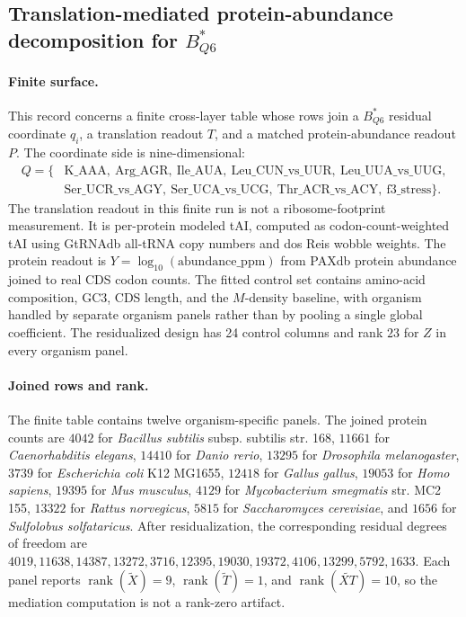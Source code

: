 \subsection{Translation-mediated protein-abundance decomposition for $B^*_{Q6}$}\label{sec:biorality-q6-translation-mediated-protein-abundance}

\paragraph{Finite surface.}
This record concerns a finite cross-layer table whose rows join a $B^*_{Q6}$ residual coordinate $q_i$, a translation readout $T$, and a matched protein-abundance readout $P$.  The coordinate side is nine-dimensional:
$$
\begin{aligned}
Q = \{&\mathrm{K\_AAA},\ \mathrm{Arg\_AGR},\ \mathrm{Ile\_AUA},\ \mathrm{Leu\_CUN\_vs\_UUR},\ \mathrm{Leu\_UUA\_vs\_UUG},\\
&\mathrm{Ser\_UCR\_vs\_AGY},\ \mathrm{Ser\_UCA\_vs\_UCG},\ \mathrm{Thr\_ACR\_vs\_ACY},\ \mathrm{f3\_stress}\}.
\end{aligned}
$$
The translation readout in this finite run is not a ribosome-footprint measurement.  It is per-protein modeled tAI, computed as codon-count-weighted tAI using GtRNAdb all-tRNA copy numbers and dos Reis wobble weights.  The protein readout is $Y=\log_{10}(\mathrm{abundance\_ppm})$ from PAXdb protein abundance joined to real CDS codon counts.  The fitted control set contains amino-acid composition, GC3, CDS length, and the $M$-density baseline, with organism handled by separate organism panels rather than by pooling a single global coefficient.  The residualized design has 24 control columns and rank $23$ for $Z$ in every organism panel.

\paragraph{Joined rows and rank.}
The finite table contains twelve organism-specific panels.  The joined protein counts are $4042$ for \emph{Bacillus subtilis} subsp. subtilis str. 168, $11661$ for \emph{Caenorhabditis elegans}, $14410$ for \emph{Danio rerio}, $13295$ for \emph{Drosophila melanogaster}, $3739$ for \emph{Escherichia coli} K12 MG1655, $12418$ for \emph{Gallus gallus}, $19053$ for \emph{Homo sapiens}, $19395$ for \emph{Mus musculus}, $4129$ for \emph{Mycobacterium smegmatis} str. MC2 155, $13322$ for \emph{Rattus norvegicus}, $5815$ for \emph{Saccharomyces cerevisiae}, and $1656$ for \emph{Sulfolobus solfataricus}.  After residualization, the corresponding residual degrees of freedom are $4019,11638,14387,13272,3716,12395,19030,19372,4106,13299,5792,1633$.  Each panel reports $\operatorname{rank}(\widetilde X)=9$, $\operatorname{rank}(\widetilde T)=1$, and $\operatorname{rank}(\widetilde{XT})=10$, so the mediation computation is not a rank-zero artifact.


